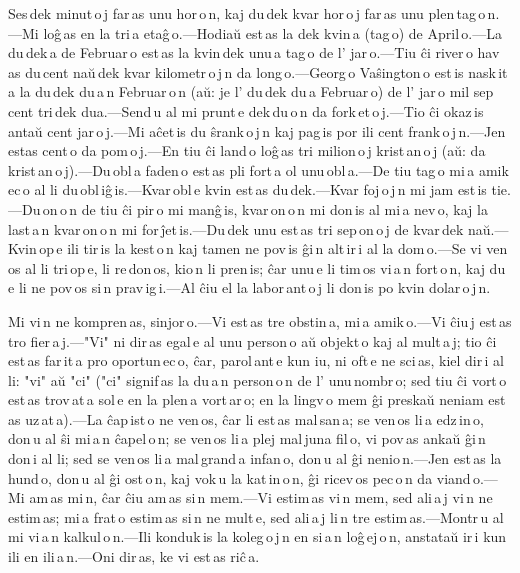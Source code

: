 Ses\,dek minut\,o\,j far\,as unu hor\,o\,n, kaj du\,dek kvar hor\,o\,j far\,as unu plen\,tag\,o\,n.---Mi loĝ\,as en la tri\,a etaĝ\,o.---Hodiaŭ est\,as la dek kvin\,a (tag\,o) de April\,o.---La du\,dek\,a de Februar\,o est\,as la kvin\,dek unu\,a tag\,o de l' jar\,o.---Tiu ĉi river\,o hav\,as du\,cent naŭ\,dek kvar kilometr\,o\,j\,n da long\,o.---Georg\,o Vaŝington\,o est\,is nask\,it\,a la du\,dek du\,a\,n Februar\,o\,n (aŭ: je l' du\,dek du\,a Februar\,o) de l' jar\,o mil sep\,cent tri\,dek dua.---Send\,u al mi prunt\,e dek\,du\,o\,n da fork\,et\,o\,j.---Tio ĉi okaz\,is antaŭ cent jar\,o\,j.---Mi aĉet\,is du ŝrank\,o\,j\,n kaj pag\,is por ili cent frank\,o\,j\,n.---Jen estas cent\,o da pom\,o\,j.---En tiu ĉi land\,o loĝ\,as tri milion\,o\,j krist\,an\,o\,j (aŭ: da krist\,an\,o\,j).---Du\,obl\,a faden\,o est\,as pli fort\,a ol unu\,obl\,a.---De tiu tag\,o mi\,a amik\,ec\,o al li du\,obl\,iĝ\,is.---Kvar\,obl\,e kvin est\,as du\,dek.---Kvar foj\,o\,j\,n mi jam est\,is tie.---Du\,on\,o\,n de tiu ĉi pir\,o mi manĝ\,is, kvar\,on\,o\,n mi don\,is al mi\,a nev\,o, kaj la last\,a\,n kvar\,on\,o\,n mi for\,ĵet\,is.---Du\,dek unu est\,as tri sep\,on\,o\,j de kvar\,dek naŭ.---Kvin\,op\,e ili tir\,is la kest\,o\,n kaj tamen ne pov\,is ĝi\,n alt\,ir\,i al la dom\,o.---Se vi ven\,os al li tri\,op\,e, li re\,don\,os, kio\,n li pren\,is; ĉar unu\,e li tim\,os vi\,a\,n fort\,o\,n, kaj du\,e li ne pov\,os si\,n prav\,ig\,i.---Al ĉiu el la labor\,ant\,o\,j li don\,is po kvin dolar\,o\,j\,n. 



Mi vi\,n ne kompren\,as, sinjor\,o.---Vi est\,as tre obstin\,a, mi\,a amik\,o.---Vi ĉiu\,j est\,as tro fier\,a\,j.---"Vi" ni dir\,as egal\,e al unu person\,o aŭ objekt\,o kaj al mult\,a\,j; tio ĉi est\,as far\,it\,a pro oportun\,ec\,o, ĉar, parol\,ant\,e kun iu, ni oft\,e ne sci\,as, kiel dir\,i al li: "vi" aŭ "ci" ("ci" signif\,as la du\,a\,n person\,o\,n de l' unu\,nombr\,o; sed tiu ĉi vort\,o est\,as trov\,at\,a sol\,e en la plen\,a vort\,ar\,o; en la lingv\,o mem ĝi preskaŭ neniam est\,as uz\,at\,a).---La ĉap\,ist\,o ne ven\,os, ĉar li est\,as mal\,san\,a; se ven\,os li\,a edz\,in\,o, don\,u al ŝi mi\,a\,n ĉapel\,o\,n; se ven\,os li\,a plej mal\,juna fil\,o, vi pov\,as ankaŭ ĝi\,n don\,i al li; sed se ven\,os li\,a mal\,grand\,a infan\,o, don\,u al ĝi nenio\,n.---Jen est\,as la hund\,o, don\,u al ĝi ost\,o\,n, kaj vok\,u la kat\,in\,o\,n, ĝi ricev\,os pec\,o\,n da viand\,o.---Mi am\,as mi\,n, ĉar ĉiu am\,as si\,n mem.---Vi estim\,as vi\,n mem, sed ali\,a\,j vi\,n ne estim\,as; mi\,a frat\,o estim\,as si\,n ne mult\,e, sed ali\,a\,j li\,n tre estim\,as.---Montr\,u al mi vi\,a\,n kalkul\,o\,n.---Ili konduk\,is la koleg\,o\,j\,n en si\,a\,n loĝ\,ej\,o\,n, anstataŭ ir\,i kun ili en ili\,a\,n.---Oni dir\,as, ke vi est\,as riĉ\,a. 


